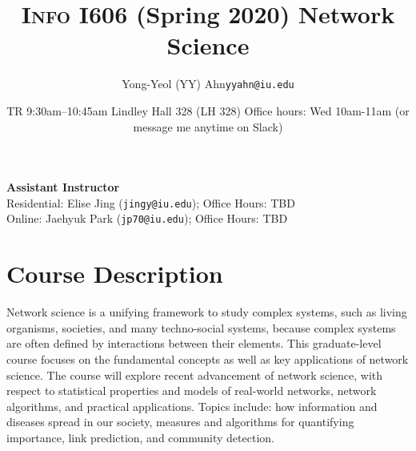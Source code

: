 \documentclass[11pt,article,oneside]{memoir} %
\makeatletter
\def\myauthor{Author}
\def\mytitle{Title}
\def\myemail{yyahn@iu.edu}
\def\myauthor{Yong-Yeol (YY) Ahn}
\def\mytitle{{\normalsize \textsc{Info} I606 (Spring 2020) \newline} \HUGE Network Science}
\makeatother
\begin{document}


\def\ind{\hangindent=1 true cm\hangafter=1 \noindent}
\def\labelitemi{$\cdot$}


\title{\LARGE \mytitle}
\author{\Large\myauthor \newline \footnotesize\texttt{\noindent\myemail}}
\date{TR 9:30am--10:45am%
\newline Lindley Hall 328 (LH 328)
\newline Office hours: Wed 10am-11am (or message me anytime on Slack)}

\maketitle
\vspace{-20pt}
{\bfseries Assistant Instructor} \\ Residential: Elise Jing (\texttt{jingy@iu.edu}); Office Hours: TBD \\ Online: Jaehyuk Park (\texttt{jp70@iu.edu}); Office Hours: TBD

\section{Course Description} %

Network science is a unifying framework to study complex systems, such as living organisms, societies, and many techno-social systems, because complex systems are often defined by interactions between their elements.
This graduate-level course focuses on the fundamental concepts as well as key applications of network science.
The course will explore recent advancement of network science, with respect to statistical properties and models of real-world networks, network algorithms, and practical applications.
Topics include: how information and diseases spread in our society, measures and algorithms for quantifying importance, link prediction, and community detection.

\end{document}
